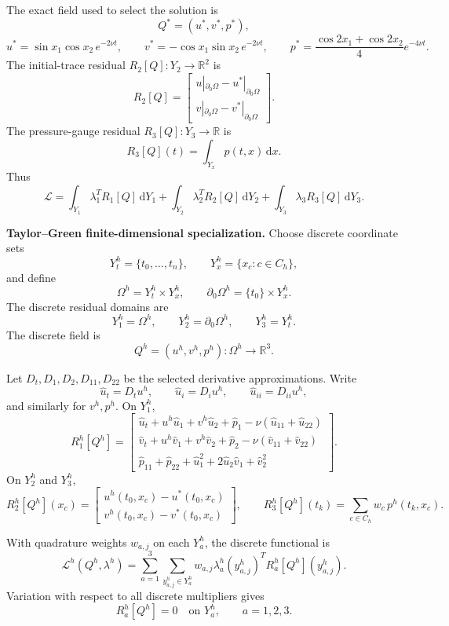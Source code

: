 \documentclass[10pt]{article}
\newcommand{\R}{\mathbb R}
\newcommand{\dd}{\,\mathrm d}
\begin{document}
The exact field used to select the solution is
\[
  Q^*=(u^*,v^*,p^*),
\]
\[
  u^*=\sin x_1\cos x_2\,e^{-2\nu t},\qquad
  v^*=-\cos x_1\sin x_2\,e^{-2\nu t},\qquad
  p^*=\frac{\cos 2x_1+\cos 2x_2}{4}e^{-4\nu t}.
\]
The initial-trace residual \(R_2[Q]:Y_2\to\R^2\) is
\[
R_2[Q]=
\begin{bmatrix}
u|_{\partial_0\Omega}-u^*|_{\partial_0\Omega}\\
v|_{\partial_0\Omega}-v^*|_{\partial_0\Omega}
\end{bmatrix}.
\]
The pressure-gauge residual \(R_3[Q]:Y_3\to\R\) is
\[
  R_3[Q](t)=\int_{Y_x}p(t,x)\dd x .
\]
Thus
\[
\mathcal L
=
\int_{Y_1}\lambda_1^T R_1[Q]\dd Y_1
+
\int_{Y_2}\lambda_2^T R_2[Q]\dd Y_2
+
\int_{Y_3}\lambda_3 R_3[Q]\dd Y_3 .
\]

\textbf{Taylor--Green finite-dimensional specialization.}
Choose discrete coordinate sets
\[
  Y_t^h=\{t_0,\ldots,t_n\},\qquad
  Y_x^h=\{x_c:c\in C_h\},
\]
and define
\[
  \Omega^h=Y_t^h\times Y_x^h,\qquad
  \partial_0\Omega^h=\{t_0\}\times Y_x^h.
\]
The discrete residual domains are
\[
  Y_1^h=\Omega^h,\qquad
  Y_2^h=\partial_0\Omega^h,\qquad
  Y_3^h=Y_t^h.
\]
The discrete field is
\[
  Q^h=(u^h,v^h,p^h):\Omega^h\to\R^3 .
\]

Let \(D_t,D_1,D_2,D_{11},D_{22}\) be the selected derivative approximations.
Write
\[
  \widehat u_t=D_tu^h,\qquad
  \widehat u_i=D_i u^h,\qquad
  \widehat u_{ii}=D_{ii}u^h,
\]
and similarly for \(v^h,p^h\).  On \(Y_1^h\),
\[
R_1^h[Q^h]=
\begin{bmatrix}
\widehat u_t+u^h\widehat u_1+v^h\widehat u_2+\widehat p_1
  -\nu(\widehat u_{11}+\widehat u_{22})\\
\widehat v_t+u^h\widehat v_1+v^h\widehat v_2+\widehat p_2
  -\nu(\widehat v_{11}+\widehat v_{22})\\
\widehat p_{11}+\widehat p_{22}
  +\widehat u_1^2+2\widehat u_2\widehat v_1+\widehat v_2^2
\end{bmatrix}.
\]
On \(Y_2^h\) and \(Y_3^h\),
\[
R_2^h[Q^h](x_c)=
\begin{bmatrix}
u^h(t_0,x_c)-u^*(t_0,x_c)\\
v^h(t_0,x_c)-v^*(t_0,x_c)
\end{bmatrix},
\qquad
R_3^h[Q^h](t_k)=\sum_{c\in C_h}w_c\,p^h(t_k,x_c).
\]

With quadrature weights \(w_{a,j}\) on each \(Y_a^h\), the discrete
functional is
\[
  \boxed{
  \mathcal L^h(Q^h,\lambda^h)
  =
  \sum_{a=1}^3
  \sum_{y_{a,j}^h\in Y_a^h}
  w_{a,j}\lambda_a^h(y_{a,j}^h)^T
  R_a^h[Q^h](y_{a,j}^h)
  }.
\]
Variation with respect to all discrete multipliers gives
\[
  R_a^h[Q^h]=0\quad\text{on }Y_a^h,\qquad a=1,2,3.
\]
\end{document}
